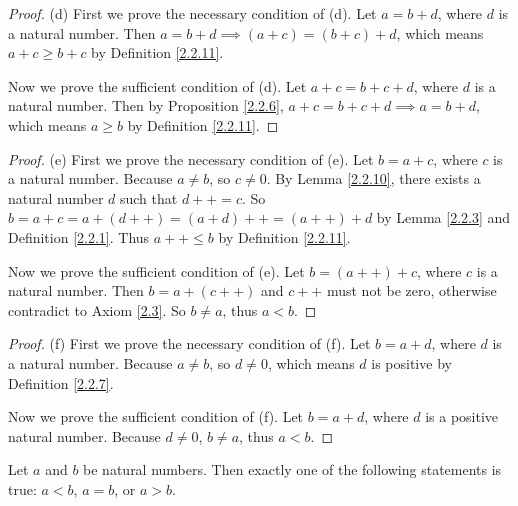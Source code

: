 \begin{proof}{(d)}
First we prove the necessary condition of (d).
Let \(a = b + d\), where \(d\) is a natural number.
Then \(a = b + d \implies (a + c) = (b + c) + d\), which means \(a + c \geq b + c\) by Definition \ref{2.2.11}.

Now we prove the sufficient condition of (d).
Let \(a + c = b + c + d\), where \(d\) is a natural number.
Then by Proposition \ref{2.2.6}, \(a + c = b + c + d \implies a = b + d\), which means \(a \geq b\) by Definition \ref{2.2.11}.
\end{proof}

\begin{proof}{(e)}
First we prove the necessary condition of (e).
Let \(b = a + c\), where \(c\) is a natural number.
Because \(a \neq b\), so \(c \neq 0\).
By Lemma \ref{2.2.10}, there exists a natural number \(d\) such that \(d++ = c\).
So \(b = a + c = a + (d++) = (a + d)++ = (a++) + d\) by Lemma \ref{2.2.3} and Definition \ref{2.2.1}.
Thus \(a++ \leq b\) by Definition \ref{2.2.11}.

Now we prove the sufficient condition of (e).
Let \(b = (a++) + c\), where \(c\) is a natural number.
Then \(b = a + (c++)\) and \(c++\) must not be zero, otherwise contradict to Axiom \ref{2.3}.
So \(b \neq a\), thus \(a < b\).
\end{proof}

\begin{proof}{(f)}
First we prove the necessary condition of (f).
Let \(b = a + d\), where \(d\) is a natural number.
Because \(a \neq b\), so \(d \neq 0\), which means \(d\) is positive by Definition \ref{2.2.7}.

Now we prove the sufficient condition of (f).
Let \(b = a + d\), where \(d\) is a positive natural number.
Because \(d \neq 0\), \(b \neq a\), thus \(a < b\).
\end{proof}

\begin{proposition}\label{2.2.13}
Let \(a\) and \(b\) be natural numbers.
Then exactly one of the following statements is true: \(a < b\), \(a = b\), or \(a > b\).
\end{proposition}

